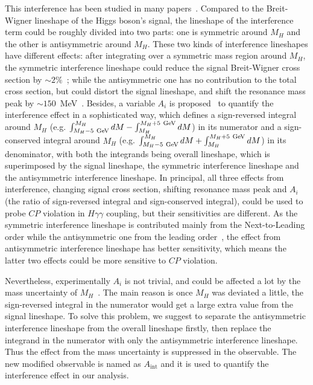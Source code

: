 \documentclass[twocolumn,
prd,amssymb,amsmath,preprintnumbers,
floatfix,aps,nofootinbib]{revtex4-1}
\begin{document}
This interference has been studied in many papers~\cite{Dicus:1987fk,
Dixon:2003yb,Martin:2012xc,deFlorian:2013psa,Martin:2013ula,Dixon:2013haa,Campbell:2017rke,Djouadi:2016ack}.
Compared to the Breit-Wigner lineshape of the Higgs boson's signal,
 the lineshape of the interference term could be roughly divided into two parts:
 one is symmetric around $M_H$ and the other is antisymmetric around $M_H$.
These two kinds of interference lineshapes
have different effects:
after integrating over a symmetric mass region around $M_H$, the symmetric interference lineshape could reduce the signal Breit-Wigner cross section by $\sim2\%$~\cite{Campbell:2017rke}; while the antisymmetric one has no contribution to the total cross section, but could
 distort the signal lineshape, and shift the resonance mass peak by
$\sim150$~MeV~\cite{Martin:2012xc,Dixon:2013haa}.
Besides,
a variable $A_i$
is proposed~\cite{Lillie:2007ve, Bian:2015hda} to quantify the interference effect in a sophisticated way,
which defines a sign-reversed integral around $M_H$ (e.g. $\int_{M_H-5~\textup{GeV}}^{M_H}dM
-\int^{M_H+5~\textup{GeV}}_{M_H}dM$)
in its numerator and a sign-conserved integral around $M_H$ (e.g. $\int_{M_H-5~\textup{GeV}}^{M_H}dM
+\int^{M_H+5~\textup{GeV}}_{M_H}dM$) in its denominator,
with both the integrands being overall lineshape, which is superimposed by the signal lineshape, the symmetric interference lineshape and the antisymmetric interference lineshape.
In principal, all three
effects from interference, changing signal cross section, shifting resonance mass peak and
$A_i$ (the ratio of sign-reversed integral and sign-conserved integral),
could be used to probe $CP$ violation in $H\gamma\gamma$
coupling, but their sensitivities are different.
As the symmetric interference lineshape is contributed
mainly from the Next-to-Leading order
 while the antisymmetric one from the leading order~\cite{Dixon:2003yb,Campbell:2017rke},
 the effect from antisymmetric interference lineshape has
better sensitivity,
which means the latter two effects could be more sensitive to $CP$ violation.

Nevertheless, experimentally $A_i$ is not trivial, and could be affected a lot by the mass
uncertainty of $M_H$~\cite{Bian:2015hda}. The main reason is once $M_H$ was deviated a little,
the sign-reversed integral in the numerator would get a large extra value from the signal lineshape.
To solve this problem, we suggest to separate the antisymmetric interference lineshape from the overall
lineshape firstly, then replace the integrand in the numerator with only the antisymmetric interference lineshape.
Thus the effect from the mass uncertainty is suppressed in the observable. The new modified observable
is named as $A_{\text{int}}$ and it is used to quantify the interference effect in our analysis.
\end{document}

